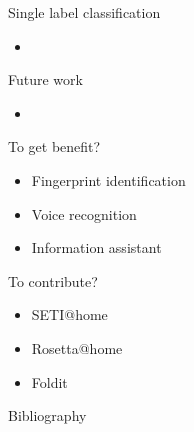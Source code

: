 \documentclass[first=dgreen,second=purple,logo=yellowexc]{aaltoslides}
\begin{document}
{\begin{frame}{Single label classification}
	\begin{itemize}
		\item 
	\end{itemize}
\end{frame}



\begin{frame}{Future work}
	\begin{itemize}
		\item 
	\end{itemize}
\end{frame}


\begin{frame}{To get benefit?}
	\begin{itemize}
		\item Fingerprint identification
		\item Voice recognition
		\item Information assistant
	\end{itemize}
\end{frame}


\begin{frame}{To contribute?}
	\begin{itemize}
		\item SETI@home
		\item Rosetta@home
		\item Foldit
	\end{itemize}
\end{frame}










\begin{frame}[allowframebreaks]{Bibliography}
%

 
\end{frame}

}
\end{document}
